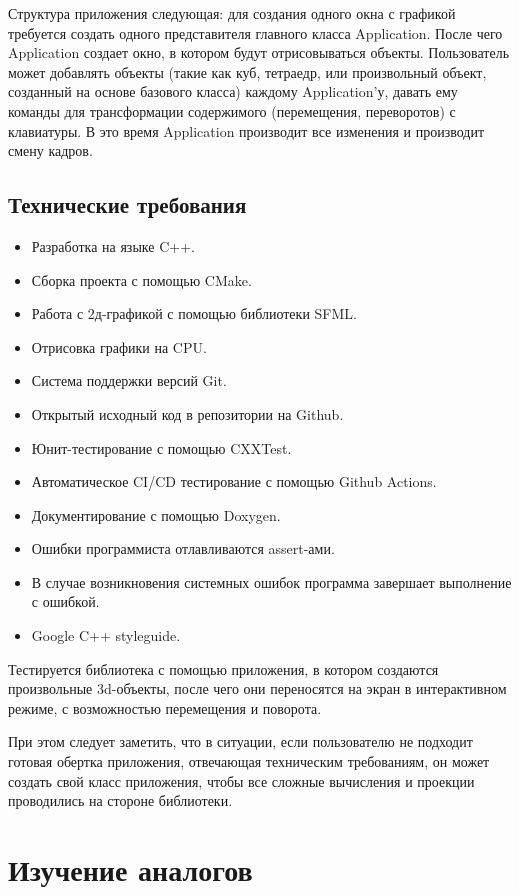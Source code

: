 \documentclass{article}
\begin{document}
Структура приложения следующая: для создания одного окна с графикой требуется создать одного представителя главного класса Application. После чего Application создает окно, в котором будут отрисовываться объекты. Пользователь может добавлять объекты (такие как куб, тетраедр, или произвольный объект, созданный на основе базового класса) каждому Application'у, давать ему команды для трансформации содержимого (перемещения, переворотов) с клавиатуры. В это время Application производит все изменения и производит смену кадров.

\subsection{Технические требования}
\begin{itemize}
\item Разработка на языке C++.
\item Сборка проекта с помощью CMake.
\item Работа с 2д-графикой с помощью библиотеки SFML.
\item Отрисовка графики на CPU.
\item Система поддержки версий Git.
\item Открытый исходный код в репозитории на Github.
\item Юнит-тестирование с помощью CXXTest.
\item Автоматическое CI/CD тестирование с помощью Github Actions.
\item Документирование с помощью Doxygen.
\item Ошибки программиста отлавливаются assert-ами.
\item В случае возникновения системных ошибок программа завершает выполнение с ошибкой.
\item Google C++ styleguide.
\end{itemize}

Тестируется библиотека с помощью приложения, в котором создаются произвольные 3d-объекты, после чего они переносятся на экран в интерактивном режиме, с возможностью перемещения и поворота.

При этом следует заметить, что в ситуации, если пользователю не подходит готовая обертка приложения, отвечающая техническим требованиям, он может создать свой класс приложения, чтобы все сложные вычисления и проекции проводились на стороне библиотеки.

\newpage

\section{Изучение аналогов}
\end{document}
